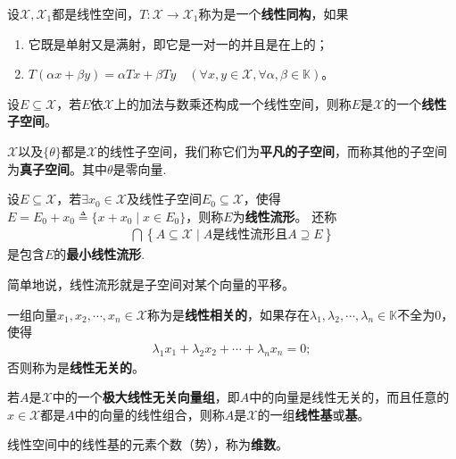 \documentclass[../../main.tex]{subfiles}%
\begin{document}
\begin{definition}[线性同构]
设$\mathscr{X},\mathscr{X}_1$都是线性空间，$T:\mathscr{X}\to\mathscr{X}_1$称为是一个\textbf{线性同构}，如果
\begin{enumerate}[(1)]
\item 它既是单射又是满射，即它是一对一的并且是在上的；
\item $T(\alpha x+\beta y)=\alpha Tx+\beta Ty\quad(\forall x,y\in\mathscr{X},\forall\alpha,\beta\in\mathbb{K})$。
\end{enumerate}
\end{definition}

\begin{definition}[线性子空间]
设$E\subseteq\mathscr{X}$，若$E$依$\mathscr{X}$上的加法与数乘还构成一个线性空间，则称$E$是$\mathscr{X}$的一个\textbf{线性子空间}。

$\mathscr{X}$以及$\{\theta\}$都是$\mathscr{X}$的线性子空间，我们称它们为\textbf{平凡的子空间}，而称其他的子空间为\textbf{真子空间}。其中$\theta$是零向量.
\end{definition}

\begin{definition}[线性流形]
设$E\subseteq\mathscr{X}$，若$\exists x_0\in\mathscr{X}$及线性子空间$E_0\subseteq\mathscr{X}$，使得$E=E_0+x_0\triangleq\{x+x_0\mid x\in E_0\}$，则称$E$为\textbf{线性流形}。
还称
\begin{align*}
\bigcap{\left\{ A\subseteq \mathscr{X} \mid A\text{是线性流形且}A\supseteq E \right\}}
\end{align*}
是包含$E$的\textbf{最小线性流形}.
\end{definition}
\begin{remark}
简单地说，线性流形就是子空间对某个向量的平移。
\end{remark}

\begin{definition}
一组向量$x_1,x_2,\cdots,x_n\in\mathscr{X}$称为是\textbf{线性相关的}，如果存在$\lambda_1,\lambda_2,\cdots,\lambda_n\in\mathbb{K}$不全为0，使得
\begin{align*}
\lambda_1x_1+\lambda_2x_2+\cdots+\lambda_nx_n=0;
\end{align*}
否则称为是\textbf{线性无关的}。
\end{definition}

\begin{definition}
若$A$是$\mathscr{X}$中的一个\textbf{极大线性无关向量组}，即$A$中的向量是线性无关的，而且任意的$x\in\mathscr{X}$都是$A$中的向量的线性组合，则称$A$是$\mathscr{X}$的一组\textbf{线性基}或\textbf{基}。

线性空间中的线性基的元素个数（势），称为\textbf{维数}。
\end{definition}
\end{document}
